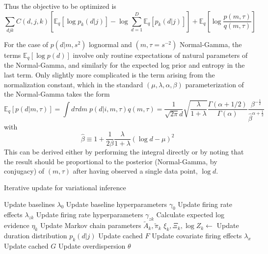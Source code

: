 \documentclass{article} %
\begin{document}
Thus the objective to be optimized is
\begin{equation}
    \sum_{d j k} C(d, j, k) \left[\mathbb{E}_q \left[\log p_k(d|j)\right] - \log \sum_{d=1}^D \mathbb{E}_q\left[p_k(d|j) \right] \right] + \mathbb{E}_q\left[\log \frac{p(m, \tau)}{q(m, \tau)} \right]
\end{equation}

For the case of $p(d|m, s^2)$ lognormal and $(m, \tau = s^{-2})$ Normal-Gamma, the terms $\mathbb{E}_q[\log p(d)]$ involve only routine expectations of natural parameters of the Normal-Gamma, and similarly for the expected log prior and entropy in the last term. Only slightly more complicated is the term arising from the normalization constant, which in the standard $(\mu, \lambda, \alpha, \beta)$ parameterization of the Normal-Gamma takes the form
\begin{equation}
    \mathbb{E}_q[p(d|m, \tau)] = \int d\tau dm \; p(d|i, m, \tau) q(m, \tau)
    = \frac{1}{\sqrt{2\pi}d} \sqrt{\frac{\lambda}{1 + \lambda}}
    \frac{\Gamma(\alpha + 1/2)}{\Gamma(\alpha)}
    \frac{\beta^{-\frac{1}{2}}}{\hat{\beta}^{\alpha + \frac{1}{2}}}
\end{equation}
with
\begin{equation}
    \hat{\beta} \equiv 1 + \frac{1}{2\beta} \frac{\lambda}{1 + \lambda}
    (\log d - \mu)^2
\end{equation}
This can be derived either by performing the integral directly or by noting that the result should be proportional to the posterior (Normal-Gamma, by conjugacy) of $(m, \tau)$ after having observed a single data point, $\log d$.

\begin{algorithm}[ht]
\caption{Iterative update for variational inference}\label{algo}
\begin{algorithmic}[1]
    \State Update baselines $\lambda_0$
    \State Update baseline hyperparameters $\gamma_0$
        \State Update firing rate effects $\lambda_{zk}$
        \State Update firing rate hyperparameters $\gamma_{zk}$
        \State Calculate expected log evidence $\eta_k$
        \State Update Markov chain parameters $\tilde{A}_k, \tilde{\pi}_k$
        \State $\xi_k, \Xi_k, \log Z_k \gets$
            \State Update duration distribution $p_k(d|j)$
        \EndIf
        \State Update cached $F$
    \EndFor
    \State Update covariate firing effects $\lambda_x$
    \State Update cached $G$
    \State Update overdispersion $\theta$
\EndProcedure
\end{algorithmic}
\end{algorithm}
\end{document}
